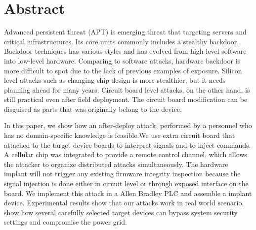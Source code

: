 \section{Abstract}
\label{sec:abstract}
Advanced persistent threat (APT) is emerging threat that targeting servers and critical infrastructures.
Its core units commonly includes a stealthy backdoor. Backdoor techniques has various styles and has evolved from high-level software into low-level hardware. Comparing to software attacks, hardware backdoor is more difficult to spot due to the lack of previous examples of exposure. Silicon level attacks such as changing chip design is more stealthier, but it needs planning ahead for many years. Circuit board level attacks, on the other hand, is still practical even after field deployment. The circuit board modification can be disguised as parts that was originally belong to the device. 

In this paper, we show how an after-deploy attack, performed by a personnel who has no domain-specific knowledge is feasible.We use extra circuit board that attached to the target device boards to interpret signals and to inject commands. A cellular chip was integrated to provide a remote control channel, which allows the attacker to organize distributed attacks simultaneously. The hardware implant will not trigger any existing firmware integrity inspection because the signal injection is done either in circuit level or through exposed interface on the board. We implement this attack in a Allen Bradley PLC and assemble a implant device. Experimental results show that our attacks work in real world scenario, show how several carefully selected target devices can bypass system security settings and compromise the power grid.
